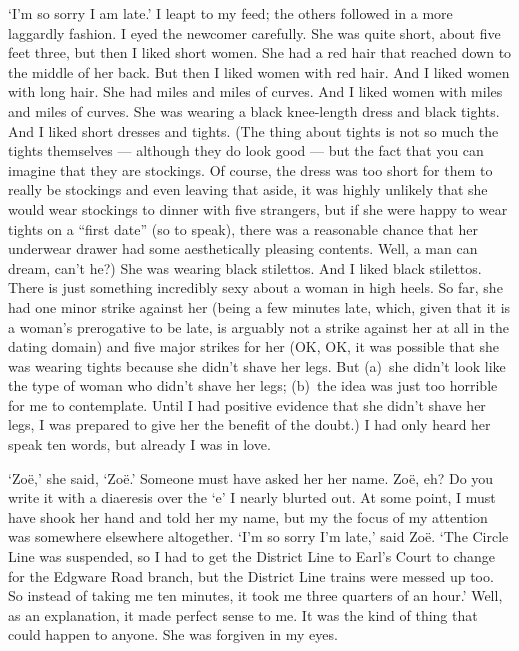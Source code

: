 `I'm so sorry I am late.' I leapt to my feed; the others
followed in a more laggardly fashion. I eyed the newcomer carefully. She was quite short, about five
feet three, but then I liked short women. She had a red hair that
reached down to the middle of her back. But then I liked women with
red hair. And I liked women with long hair. She had miles and miles
of curves. And I liked women with miles and miles of curves. She was
wearing a black knee-length dress and black tights. And I liked
short dresses and tights. (The thing about tights is not so much the tights
themselves --- although they do look good --- but the fact that you can imagine that they are
stockings. Of course, the dress was too short for them to really be
stockings and even leaving that aside, it was highly unlikely that
she would wear stockings to dinner with five strangers, but if she were happy to wear tights on a ``first
date'' (so to speak), there was a reasonable chance that her
underwear drawer had some aesthetically pleasing contents. Well, a
man can dream, can't he?) She was wearing black stilettos. And I
liked black stilettos. There is just something incredibly sexy about
a woman in high heels. So far, she had one minor strike against her
(being a few minutes late, which, given that it is a woman's
prerogative to be late, is arguably not a strike against her at all in the
dating domain) and five major strikes for her (OK, OK, it was
possible that she was wearing tights because she didn't shave her
legs. But (a)~she didn't look like the type of woman who didn't shave her legs;
(b)~the idea was just too horrible for me to contemplate. Until I
had positive evidence that she didn't shave her legs, I was prepared
to give her the benefit of the doubt.) I had only heard her speak
ten words, but already I was in love.

`Zo{\"e},' she said, `Zo{\"e}.' Someone must have asked her her
name. Zo{\"e}, eh? Do you write it with a diaeresis over the `e' I
nearly blurted out. At some point, I must have shook her hand and
told her my name, but my the focus of my attention was somewhere elsewhere altogether. `I'm so sorry I'm
late,' said Zo{\"e}. `The Circle Line was suspended, so I had to get the District
Line to Earl's Court to change for the Edgware Road branch, but the District Line trains were messed up too. So
instead of taking me ten minutes, it took me three quarters of an
hour.' Well, as an explanation, it made perfect sense to me. It was the kind of thing
that could happen to anyone. She was forgiven in my eyes.

